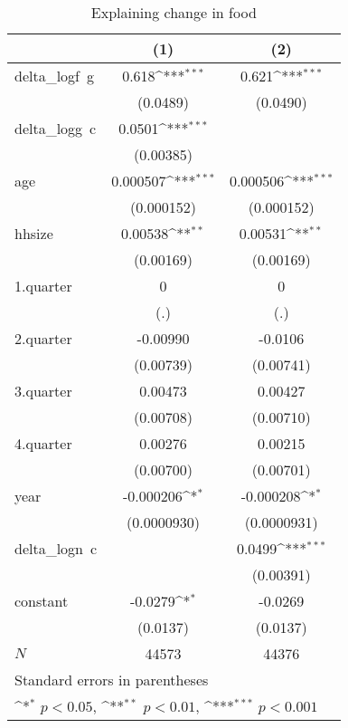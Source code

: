 \begin{table}[htbp]\centering
\def\sym#1{\ifmmode^{#1}\else\(^{#1}\)\fi}
\caption{\label{logfood\_deltacons} Explaining change in food}
\begin{tabular}{l*{2}{c}}
\hline\hline
            &\multicolumn{1}{c}{(1)}         &\multicolumn{1}{c}{(2)}         \\
\hline
delta\_logf~g&       0.618\sym{***}&       0.621\sym{***}\\
            &    (0.0489)         &    (0.0490)         \\
delta\_logg~c&      0.0501\sym{***}&                     \\
            &   (0.00385)         &                     \\
age         &    0.000507\sym{***}&    0.000506\sym{***}\\
            &  (0.000152)         &  (0.000152)         \\
hhsize      &     0.00538\sym{**} &     0.00531\sym{**} \\
            &   (0.00169)         &   (0.00169)         \\
1.quarter   &           0         &           0         \\
            &         (.)         &         (.)         \\
2.quarter   &    -0.00990         &     -0.0106         \\
            &   (0.00739)         &   (0.00741)         \\
3.quarter   &     0.00473         &     0.00427         \\
            &   (0.00708)         &   (0.00710)         \\
4.quarter   &     0.00276         &     0.00215         \\
            &   (0.00700)         &   (0.00701)         \\
year        &   -0.000206\sym{*}  &   -0.000208\sym{*}  \\
            & (0.0000930)         & (0.0000931)         \\
delta\_logn~c&                     &      0.0499\sym{***}\\
            &                     &   (0.00391)         \\
constant    &     -0.0279\sym{*}  &     -0.0269         \\
            &    (0.0137)         &    (0.0137)         \\
\hline
\(N\)       &       44573         &       44376         \\
\hline\hline
\multicolumn{3}{l}{\footnotesize Standard errors in parentheses}\\
\multicolumn{3}{l}{\footnotesize \sym{*} \(p<0.05\), \sym{**} \(p<0.01\), \sym{***} \(p<0.001\)}\\
\end{tabular}
\end{table}
